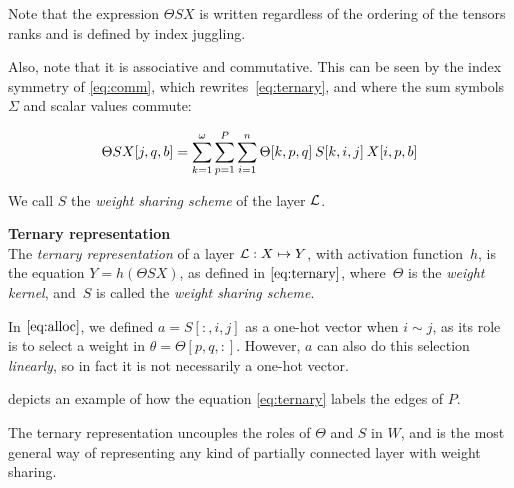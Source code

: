 \begin{remark}
Note that the expression $\Theta S X$ is written regardless of the ordering of the tensors ranks and is defined by index juggling. %
\end{remark}

Also, note that it is associative and commutative. This can be seen by the index symmetry of \eqref{eq:comm}, which rewrites~\eqref{eq:ternary}, and where the sum symbols~$\Sigma$ and scalar values commute:

\begin{gather}
\Theta SX[j,q,b] = \displaystyle \sum_{k=1}^\omega \sum_{p=1}^P \sum_{i=1}^n \Theta[k,p,q] \h{2} S[k,i,j] \h{2} X[i,p,b] \label{eq:comm}
\end{gather}

We call $S$ the \emph{weight sharing scheme} of the layer $\cl$.

\begin{definition}\textbf{Ternary representation}\\
The \emph{ternary representation} of a layer $\cl: X \mapsto Y$, with activation function~$h$, is the equation $Y = h\left(\Theta S X\right)$, as defined in $\eqref{eq:ternary}$, where~$\Theta$ is the \emph{weight kernel}, and~$S$ is called the \emph{weight sharing scheme}.
\end{definition}

\begin{remark}
In $\eqref{eq:alloc}$, we defined $a = S[:,i,j]$ as a one-hot vector when $i \sim j$, as its role is to select a weight in $\theta = \Theta[p,q,:]$. However, $a$ can also do this selection \emph{linearly}, so in fact it is not necessarily a one-hot vector.
\end{remark}

 depicts an example of how the equation \eqref{eq:ternary} labels the edges of $P$.


The ternary representation uncouples the roles of $\Theta$ and $S$ in $W$, and is the most general way of representing any kind of partially connected layer with weight sharing.
